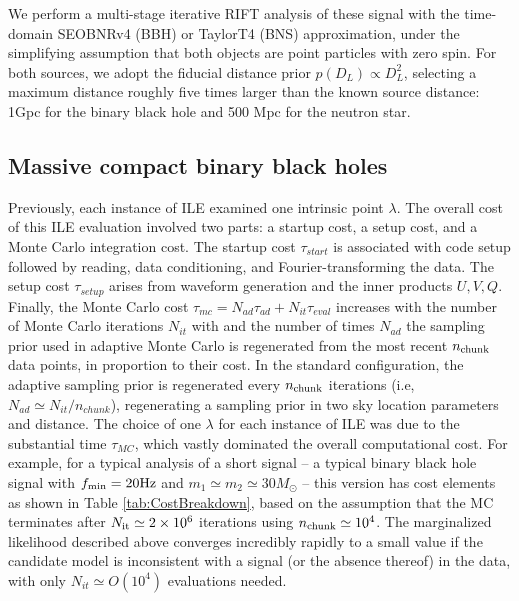 \documentclass[twocolumn,prd,nofootinbib]{revtex4}
\newcommand\unit[1]{{\rm #1}}
\begin{document}
 We perform a multi-stage iterative RIFT analysis of these signal with the
time-domain SEOBNRv4 (BBH) or TaylorT4 (BNS) approximation, under the simplifying assumption that both objects are point particles with zero
spin.   For both sources, we adopt the fiducial distance prior $p(D_L) \propto D_L^2$,   selecting  a maximum distance
roughly five times larger than the known source distance: 1Gpc for the binary black hole and 500 Mpc for the neutron star.


\subsection{Massive compact binary black holes}
Previously, each instance of ILE examined one intrinsic point $\lambda$.  The overall cost of this ILE evaluation
involved two parts: a startup cost, a setup cost, and a Monte Carlo integration cost.  The  startup cost $\tau_{start}$
is associated with code setup followed by reading, data conditioning, and Fourier-transforming the
data.  The setup cost $\tau_{setup}$ arises from waveform generation and  the inner products $U,V,Q$.  Finally, the Monte Carlo
cost $\tau_{mc}=N_{ad} \tau_{ad}+N_{it}\tau_{eval}$ increases with the number of Monte Carlo iterations $N_{it}$ with
and the number of times $N_{ad}$ the sampling prior used in adaptive Monte Carlo is regenerated from the most recent 
$n_{\rm chunk}$ data points, in proportion to their
cost.   In the standard configuration, the adaptive sampling prior is regenerated every $n_{\rm chunk}$ iterations (i.e,
 $N_{ad} \simeq N_{it}/n_{chunk}$), regenerating a sampling prior in two sky location parameters and distance.  
The choice of one $\lambda$ for each instance of ILE was due to the substantial time  $\tau_{MC}$, which vastly
dominated the overall computational cost.   For example, for a typical analysis of a short signal --  a typical binary
black hole signal with $f_{\rm min}=20 \unit{Hz}$ and $m_1\simeq m_2\simeq 30 M_\odot$ --  this version has
cost elements as shown in Table \ref{tab:CostBreakdown}, based on the assumption that the MC terminates after $N_{\rm it}\simeq 2\times 10^6$ iterations using
$n_{\rm chunk}\simeq 10^4$.  
The marginalized likelihood described above  converges incredibly rapidly to a small value if the candidate model is
inconsistent with a signal (or the absence thereof) in the data, with only $N_{it} \simeq O(10^4)$  evaluations needed.
\end{document}

